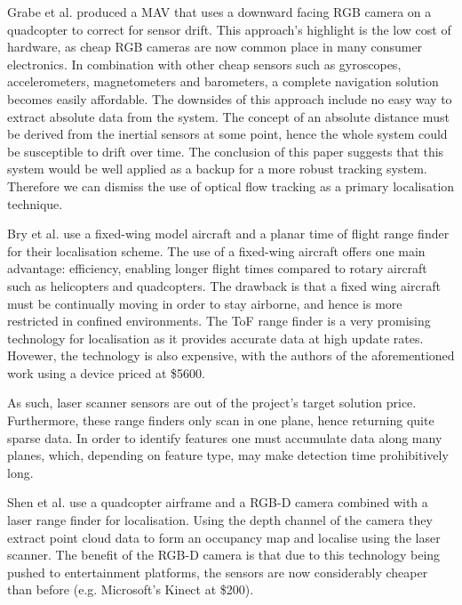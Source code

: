 \documentclass[]{article}
\begin{document}
{Grabe et al. \cite{DBLP:conf/icra/GrabeBG12} produced a MAV that uses a downward facing RGB camera on a quadcopter to correct for sensor drift. This approach's highlight is the low cost of hardware, as cheap RGB cameras are now common place in many consumer electronics. In combination with other cheap sensors such as gyroscopes, accelerometers, magnetometers and barometers, a complete navigation solution becomes easily affordable. The downsides of this approach include no easy way to extract absolute data from the system. The concept of an absolute distance must be derived from the inertial sensors at some point, hence the whole system could be susceptible to drift over time. The conclusion of this paper suggests that this system would be well applied as a backup for a more robust tracking system. Therefore we can dismiss the use of optical flow tracking as a primary localisation technique. 

Bry et al. \cite{Bry2012} use a fixed-wing model aircraft and a planar time of flight range finder for their localisation scheme. The use of a fixed-wing aircraft offers one main advantage: efficiency, enabling longer flight times compared to rotary aircraft such as helicopters and quadcopters. The drawback is that a fixed wing aircraft must be continually moving in order to stay airborne, and hence is more restricted in confined environments. The ToF range finder is a very promising technology for localisation as it provides accurate data at high update rates. Hovewer, the technology is also expensive, with the authors of the aforementioned work using a device priced at \$5600.

As such, laser scanner sensors are out of the project's target solution price. Furthermore, these range finders only scan in one plane, hence returning quite sparse data. In order to identify features one must accumulate data along many planes, which, depending on feature type, may make detection time prohibitively long. 

Shen et al. \cite{Shen2012} use a quadcopter airframe and a RGB-D camera combined with a laser range finder for localisation. Using the depth channel of the camera they extract point cloud data to form an occupancy map and localise using the laser scanner. The benefit of the RGB-D camera is that due to this technology being pushed to entertainment platforms, the sensors are now considerably cheaper than before (e.g. Microsoft's Kinect at \$200). 

}
\end{document}
